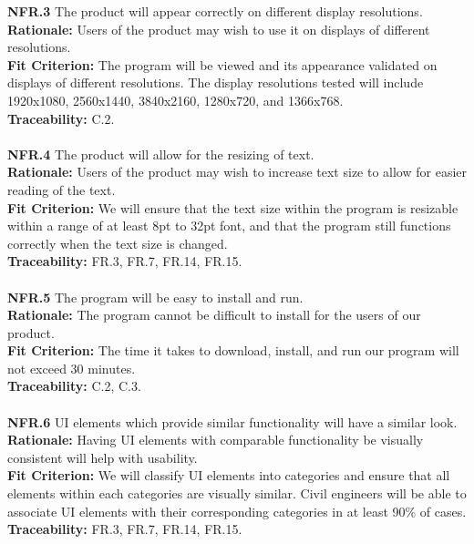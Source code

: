 \documentclass[12pt]{article}
\begin{document}
  \noindent\textbf{NFR.3} The product will appear correctly on different display resolutions.\\
  \textbf{Rationale:} Users of the product may wish to use it on displays of different resolutions.\\
  \textbf{Fit Criterion:} The program will be viewed and its appearance validated on displays of different resolutions. The display resolutions tested will include 1920x1080,
   2560x1440, 3840x2160, 1280x720, and 1366x768.\\
  \textbf{Traceability:} C.2.\\\\

  \noindent\textbf{NFR.4} The product will allow for the resizing of text.\\
  \textbf{Rationale:} Users of the product may wish to increase text size to allow for easier reading of the text.\\
  \textbf{Fit Criterion:} We will ensure that the text size within the program is resizable within a range of at least 8pt to 32pt font, 
  and that the program still functions correctly when the text size is changed.\\
  \textbf{Traceability:} FR.3, FR.7, FR.14, FR.15.\\\\

  \noindent\textbf{NFR.5} The program will be easy to install and run.\\
  \textbf{Rationale:} The program cannot be difficult to install for the users of our product.\\
  \textbf{Fit Criterion:} The time it takes to download, install, and run our program will not exceed 30 minutes.\\
  \textbf{Traceability:} C.2, C.3.\\\\

  \noindent\textbf{NFR.6} UI elements which provide similar functionality will have a similar look.\\
  \textbf{Rationale:} Having UI elements with comparable functionality be visually consistent will help with usability.\\
  \textbf{Fit Criterion:} We will classify UI elements into categories and ensure that all elements within each categories are visually similar. 
  Civil engineers will be able to associate UI elements with their corresponding categories in at least 90\% of cases.\\
  \textbf{Traceability:} FR.3, FR.7, FR.14, FR.15.\\\\
\end{document}
